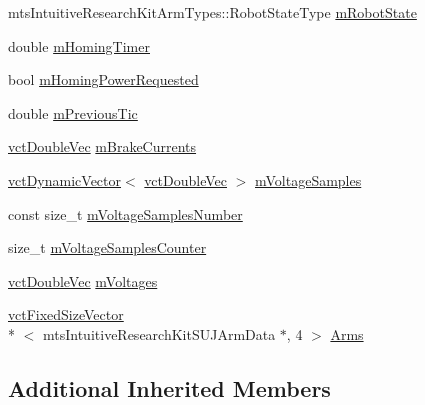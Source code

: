 \begin{DoxyCompactItemize}
\begin{tabbing}
\end{tabbing}\item 
mts\-Intuitive\-Research\-Kit\-Arm\-Types\-::\-Robot\-State\-Type \hyperlink{classmts_intuitive_research_kit_s_u_j_a4d2e2f20f9c54ca3f9c730153d313b91}{m\-Robot\-State}
\item 
double \hyperlink{classmts_intuitive_research_kit_s_u_j_ad6634774bd3eea5b7a36ae956f957ddf}{m\-Homing\-Timer}
\item 
bool \hyperlink{classmts_intuitive_research_kit_s_u_j_a8b18a57060b73cac635569abc6f206b2}{m\-Homing\-Power\-Requested}
\item 
double \hyperlink{classmts_intuitive_research_kit_s_u_j_a2e436c23462977ad86c3650cb397aef1}{m\-Previous\-Tic}
\item 
\hyperlink{vct_dynamic_vector_types_8h_ade4b3068c86fb88f41af2e5187e491c2}{vct\-Double\-Vec} \hyperlink{classmts_intuitive_research_kit_s_u_j_aed67d646259d548e4739098cc0c266ba}{m\-Brake\-Currents}
\item 
\hyperlink{classvct_dynamic_vector}{vct\-Dynamic\-Vector}$<$ \hyperlink{vct_dynamic_vector_types_8h_ade4b3068c86fb88f41af2e5187e491c2}{vct\-Double\-Vec} $>$ \hyperlink{classmts_intuitive_research_kit_s_u_j_a55e04397c08ebcb436d250a780220740}{m\-Voltage\-Samples}
\item 
const size\-\_\-t \hyperlink{classmts_intuitive_research_kit_s_u_j_ae183ff25ef089caeca009b7e882c1bb8}{m\-Voltage\-Samples\-Number}
\item 
size\-\_\-t \hyperlink{classmts_intuitive_research_kit_s_u_j_ac64bd556f3656dc6b6a59a51198eac13}{m\-Voltage\-Samples\-Counter}
\item 
\hyperlink{vct_dynamic_vector_types_8h_ade4b3068c86fb88f41af2e5187e491c2}{vct\-Double\-Vec} \hyperlink{classmts_intuitive_research_kit_s_u_j_a1fdc3671d6faec7720cb374b171e05a1}{m\-Voltages}
\item 
\hyperlink{classvct_fixed_size_vector}{vct\-Fixed\-Size\-Vector}\\*
$<$ mts\-Intuitive\-Research\-Kit\-S\-U\-J\-Arm\-Data $\ast$, 4 $>$ \hyperlink{classmts_intuitive_research_kit_s_u_j_abea003c7cf23ba8b1c58caf9d94ad455}{Arms}
\end{DoxyCompactItemize}
\subsection*{Additional Inherited Members}


